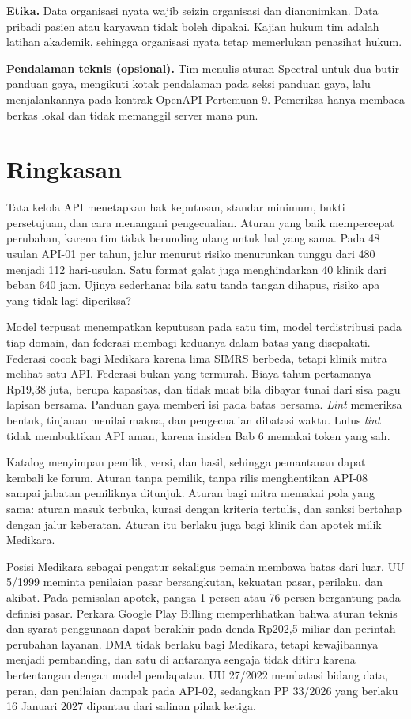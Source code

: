 \textbf{Etika.} Data organisasi nyata wajib seizin organisasi dan dianonimkan. Data pribadi pasien atau karyawan tidak boleh dipakai. Kajian hukum tim adalah latihan akademik, sehingga organisasi nyata tetap memerlukan penasihat hukum.

\textbf{Pendalaman teknis (opsional).} Tim menulis aturan Spectral untuk dua butir panduan gaya, mengikuti kotak pendalaman pada seksi panduan gaya, lalu menjalankannya pada kontrak OpenAPI Pertemuan 9. Pemeriksa hanya membaca berkas lokal dan tidak memanggil server mana pun.

\section{Ringkasan}

Tata kelola API menetapkan hak keputusan, standar minimum, bukti persetujuan, dan cara menangani pengecualian. Aturan yang baik mempercepat perubahan, karena tim tidak berunding ulang untuk hal yang sama. Pada 48 usulan API-01 per tahun, jalur menurut risiko menurunkan tunggu dari 480 menjadi 112 hari-usulan. Satu format galat juga menghindarkan 40 klinik
dari beban 640 jam. Ujinya sederhana: bila satu tanda tangan dihapus, risiko apa yang tidak lagi diperiksa?

Model terpusat menempatkan keputusan pada satu tim, model terdistribusi pada tiap domain, dan federasi membagi keduanya dalam batas yang disepakati. Federasi cocok bagi Medikara karena lima SIMRS berbeda, tetapi klinik mitra melihat satu API. Federasi bukan yang termurah. Biaya tahun pertamanya Rp19,38 juta, berupa kapasitas, dan tidak muat bila dibayar tunai dari sisa pagu lapisan bersama. Panduan gaya
memberi isi pada batas bersama. \textit{Lint} memeriksa bentuk, tinjauan menilai makna, dan pengecualian dibatasi waktu. Lulus \textit{lint} tidak membuktikan API aman, karena insiden Bab 6 memakai token yang sah.

Katalog menyimpan pemilik, versi, dan hasil, sehingga pemantauan dapat kembali ke forum. Aturan tanpa pemilik, tanpa rilis menghentikan API-08 sampai jabatan pemiliknya ditunjuk. Aturan bagi mitra memakai pola yang sama: aturan masuk terbuka, kurasi dengan kriteria tertulis, dan sanksi bertahap dengan jalur keberatan. Aturan itu berlaku juga bagi klinik dan apotek milik Medikara.

Posisi Medikara sebagai pengatur sekaligus pemain membawa batas dari luar. UU 5/1999 meminta penilaian pasar bersangkutan, kekuatan pasar, perilaku, dan akibat. Pada pemisalan apotek, pangsa 1 persen atau 76 persen bergantung pada definisi pasar. Perkara Google Play Billing memperlihatkan bahwa aturan teknis dan syarat penggunaan dapat berakhir pada denda Rp202,5 miliar dan perintah perubahan layanan.
DMA tidak berlaku bagi Medikara, tetapi kewajibannya menjadi pembanding, dan satu di antaranya sengaja tidak ditiru karena bertentangan dengan model pendapatan. UU 27/2022 membatasi bidang data, peran, dan penilaian dampak pada API-02, sedangkan PP 33/2026 yang berlaku 16 Januari 2027 dipantau dari salinan pihak ketiga.

